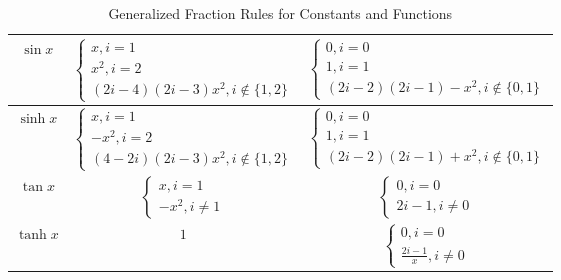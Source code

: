 \documentclass[12pt]{article}
\begin{document}
\begin{table}[h!]
{\begin{tabular}{c|c|c}
    \hline
    $\sin{x}$ \cite{second_function:wikipedia} & $\begin{cases}
        x,i=1 \\
        x^2,i=2 \\
        (2i-4)(2i-3)x^2,i\notin\{1,2\}
    \end{cases}$ & $\begin{cases}
        0,i=0 \\
        1,i=1 \\
        (2i-2)(2i-1)-x^2,i\notin\{0,1\}
    \end{cases}$ \\

    \hline
    $\sinh{x}$ \cite{third_function:wikipedia} & $\begin{cases}
        x,i=1 \\
        -x^2,i=2 \\
        (4-2i)(2i-3)x^2, i\notin\{1,2\}
    \end{cases}$ & $\begin{cases}
        0,i=0 \\
        1,i=1 \\
        (2i-2)(2i-1)+x^2,i\notin\{0,1\}
    \end{cases}$ \\

    \hline
    $\tan{x}$ \cite{fourth_function:blog} & $\begin{cases}
        x,i=1 \\
        -x^2,i\ne1
    \end{cases}$ & $\begin{cases}
        0,i=0 \\
        2i-1,i\ne0
    \end{cases}$ \\

    \hline
    $\tanh{x}$ \cite{fifth_function:wikipedia} & $1$ & $\begin{cases}
        0,i=0 \\
        \tfrac{2i-1}{x},i\ne0
    \end{cases}$
    
    \end{tabular}%
    }
    \caption{Generalized Fraction Rules for Constants and Functions}
    \label{tab:generalized_fraction_table}
\end{table}
\end{document}
